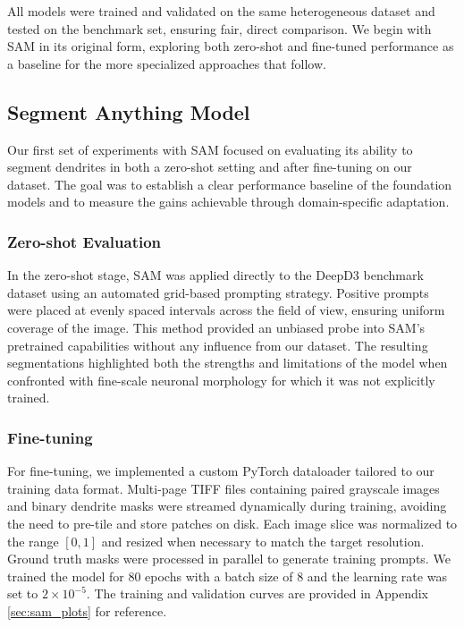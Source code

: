 All models were trained and validated on the same heterogeneous dataset and tested on the benchmark set, ensuring fair, direct comparison. We begin with \gls{SAM} in its original form, exploring both zero-shot and fine-tuned performance as a baseline for the more specialized approaches that follow.

\subsection{Segment Anything Model}
Our first set of experiments with \gls{SAM} focused on evaluating its ability to segment dendrites in both a zero-shot setting and after fine-tuning on our dataset. The goal was to establish a clear performance baseline of the foundation models and to measure the gains achievable through domain-specific adaptation.

\subsubsection{\textbf{Zero-shot Evaluation}}
In the zero-shot stage, \gls{SAM} was applied directly to the \gls{DeepD3} benchmark dataset using an automated grid-based prompting strategy. Positive prompts were placed at evenly spaced intervals across the field of view, ensuring uniform coverage of the image. This method provided an unbiased probe into \gls{SAM}’s pretrained capabilities without any influence from our dataset. The resulting segmentations highlighted both the strengths and limitations of the model when confronted with fine-scale neuronal morphology for which it was not explicitly trained.

\subsubsection{\textbf{Fine-tuning}}
For fine-tuning, we implemented a custom PyTorch dataloader tailored to our training data format. Multi-page \gls{TIFF} files containing paired grayscale images and binary dendrite masks were streamed dynamically during training, avoiding the need to pre-tile and store patches on disk. Each image slice was normalized to the range $[0,1]$ and resized when necessary to match the target resolution. Ground truth masks were processed in parallel to generate training prompts. We trained the model for 80 epochs with a batch size of 8 and the learning rate was set to $2 \times 10^{-5}$. The training and validation curves are provided in Appendix \ref{sec:sam_plots} for reference.

